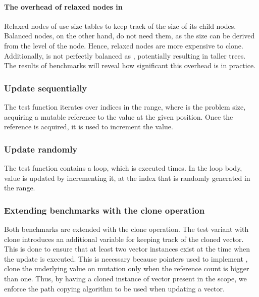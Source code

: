 \paragraph*{The overhead of relaxed nodes in \rrbtree{}}
Relaxed nodes of \rrbtree{} use size tables to keep track of the size of its child nodes. Balanced nodes, on the other hand, do not need them, as the size can be derived from the level of the node. Hence, relaxed nodes are more expensive to clone. Additionally, \rrbtree{} is not perfectly balanced as \rbtree{}, potentially resulting in taller trees. The results of benchmarks will reveal how significant this overhead is in practice.

\subsubsection*{Update sequentially}
The test function iterates over indices in the \range{[0, N)} range, where \n{} is the problem size, acquiring a mutable reference to the value at the given position. Once the reference is acquired, it is used to increment the value.

\subsubsection*{Update randomly}
The test function contains a loop, which is executed \n{} times. In the loop body, value is updated by incrementing it, at the index that is randomly generated in the \range{[0, N)} range.

\subsubsection*{Extending benchmarks with the clone operation}
Both benchmarks are extended with the clone operation. The test variant with clone introduces an additional variable for keeping track of the cloned vector. This is done to ensure that at least two vector instances exist at the time when the update is executed. This is necessary because \rc{} pointers used to implement \rbtree{}, clone the underlying value on mutation only when the reference count is bigger than one. Thus, by having a cloned instance of vector present in the scope, we enforce the path copying algorithm to be used when updating a vector.

